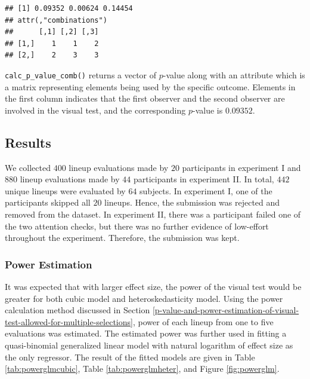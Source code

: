 \documentclass{monashthesis}
\theoremstyle{definition}
\theoremstyle{definition}
\theoremstyle{definition}
\theoremstyle{definition}
\theoremstyle{remark}
\begin{document}
\begin{Shaded}
\begin{Highlighting}[]
\NormalTok{(} \NormalTok{(}\NormalTok{, }\NormalTok{, }\NormalTok{), }
                   \NormalTok{, }
                   \NormalTok{(}\NormalTok{, }\NormalTok{, }\NormalTok{))}
\end{Highlighting}
\end{Shaded}

\begin{verbatim}
## [1] 0.09352 0.00624 0.14454
## attr(,"combinations")
##      [,1] [,2] [,3]
## [1,]    1    1    2
## [2,]    2    3    3
\end{verbatim}

\texttt{calc\_p\_value\_comb()} returns a vector of \(p\)-value along with an attribute which is a matrix representing elements being used by the specific outcome. Elements in the first column indicates that the first observer and the second observer are involved in the visual test, and the corresponding \(p\)-value is \(0.09352\).

\hypertarget{results}{%
\subsection{Results}\label{results}}

We collected \(400\) lineup evaluations made by \(20\) participants in experiment I and \(880\) lineup evaluations made by \(44\) participants in experiment II. In total, \(442\) unique lineups were evaluated by \(64\) subjects. In experiment I, one of the participants skipped all \(20\) lineups. Hence, the submission was rejected and removed from the dataset. In experiment II, there was a participant failed one of the two attention checks, but there was no further evidence of low-effort throughout the experiment. Therefore, the submission was kept.

\hypertarget{power-estimation}{%
\subsubsection{Power Estimation}\label{power-estimation}}

It was expected that with larger effect size, the power of the visual test would be greater for both cubic model and heteroskedasticity model. Using the power calculation method discussed in Section \ref{p-value-and-power-estimation-of-visual-test-allowed-for-multiple-selections}, power of each lineup from one to five evaluations was estimated. The estimated power was further used in fitting a quasi-binomial generalized linear model with natural logarithm of effect size as the only regressor. The result of the fitted models are given in Table \ref{tab:powerglmcubic}, Table \ref{tab:powerglmheter}, and Figure \ref{fig:powerglm}.
\end{document}
